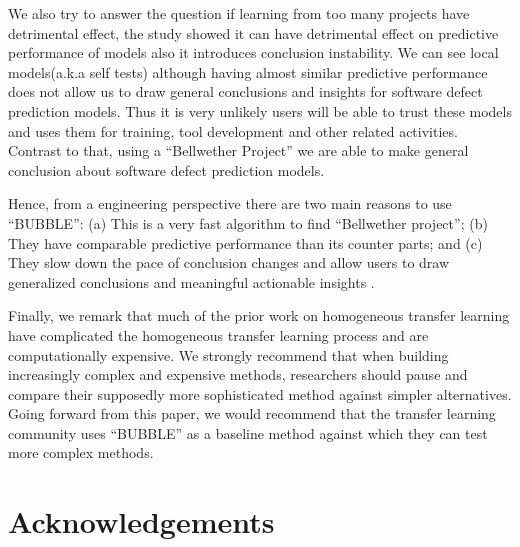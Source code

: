 \documentclass[10pt,journal,compsoc]{IEEEtran}
\begin{document}
We also try to answer the question if learning from too many projects have detrimental effect, the study showed it can have detrimental effect on predictive performance of models also it introduces conclusion instability. We can see local models(a.k.a self tests) although having almost similar predictive performance does not allow us to draw general conclusions and insights for software defect prediction models. Thus it is very unlikely users will be able to trust these models and uses them for training, tool development and other related activities. Contrast to that, using a ``Bellwether Project'' we are able to make general conclusion about software defect prediction models. 
 
Hence, from a  engineering perspective there are two main reasons to use ``BUBBLE'': (a) This is a very fast algorithm to find ``Bellwether project'';  (b) They have comparable predictive performance than its counter parts; and (c) They slow down the pace of conclusion changes and allow users to draw generalized conclusions and meaningful actionable insights .

Finally, we remark that much of the prior work on homogeneous transfer learning have complicated the homogeneous transfer learning process and are computationally expensive. We strongly recommend that when building increasingly complex and expensive  methods, researchers should pause and compare their supposedly more sophisticated method against simpler alternatives. Going forward from this paper, we would recommend that the transfer learning community uses ``BUBBLE'' as a baseline method against which they can test more complex methods.




\section{Acknowledgements}
\label{sec:ack}



 
\clearpage

% 
\end{document}
